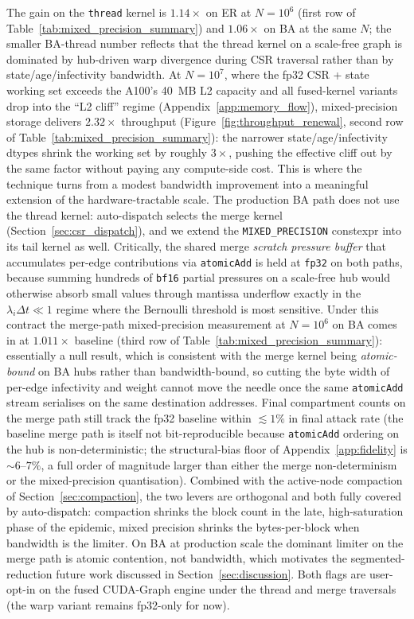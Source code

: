 \documentclass[a4paper,fleqn]{cas-sc}
\theoremstyle{definition}
\theoremstyle{remark}
\begin{document}
The gain on the \texttt{thread} kernel is $1.14\times$ on ER at $N=10^6$ (first row of Table~\ref{tab:mixed_precision_summary}) and $1.06\times$ on BA at the same $N$; the smaller BA-thread number reflects that the thread kernel on a scale-free graph is dominated by hub-driven warp divergence during CSR traversal rather than by state/age/infectivity bandwidth. At $N=10^7$, where the fp32 CSR + state working set exceeds the A100's 40~MB L2 capacity and all fused-kernel variants drop into the ``L2 cliff'' regime (Appendix~\ref{app:memory_flow}), mixed-precision storage delivers $\mathbf{2.32\times}$ throughput (Figure~\ref{fig:throughput_renewal}, second row of Table~\ref{tab:mixed_precision_summary}): the narrower state/age/infectivity dtypes shrink the working set by roughly $3\times$, pushing the effective cliff out by the same factor without paying any compute-side cost. This is where the technique turns from a modest bandwidth improvement into a meaningful extension of the hardware-tractable scale. The production BA path does not use the thread kernel: auto-dispatch selects the merge kernel (Section~\ref{sec:csr_dispatch}), and we extend the \texttt{MIXED\_PRECISION} constexpr into its tail kernel as well. Critically, the shared merge \emph{scratch pressure buffer} that accumulates per-edge contributions via \texttt{atomicAdd} is held at \texttt{fp32} on both paths, because summing hundreds of \texttt{bf16} partial pressures on a scale-free hub would otherwise absorb small values through mantissa underflow exactly in the $\lambda_i \Delta t \ll 1$ regime where the Bernoulli threshold is most sensitive. Under this contract the merge-path mixed-precision measurement at $N = 10^6$ on BA comes in at $1.011\times$ baseline (third row of Table~\ref{tab:mixed_precision_summary}): essentially a null result, which is consistent with the merge kernel being \emph{atomic-bound} on BA hubs rather than bandwidth-bound, so cutting the byte width of per-edge infectivity and weight cannot move the needle once the same \texttt{atomicAdd} stream serialises on the same destination addresses. Final compartment counts on the merge path still track the fp32 baseline within $\lesssim\!1\%$ in final attack rate (the baseline merge path is itself not bit-reproducible because \texttt{atomicAdd} ordering on the hub is non-deterministic; the structural-bias floor of Appendix~\ref{app:fidelity} is $\sim\!6$--$7\%$, a full order of magnitude larger than either the merge non-determinism or the mixed-precision quantisation). Combined with the active-node compaction of Section~\ref{sec:compaction}, the two levers are orthogonal and both fully covered by auto-dispatch: compaction shrinks the block count in the late, high-saturation phase of the epidemic, mixed precision shrinks the bytes-per-block when bandwidth is the limiter. On BA at production scale the dominant limiter on the merge path is atomic contention, not bandwidth, which motivates the segmented-reduction future work discussed in Section~\ref{sec:discussion}. Both flags are user-opt-in on the fused CUDA-Graph engine under the thread and merge traversals (the warp variant remains fp32-only for now).
\end{document}

